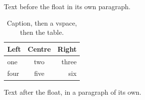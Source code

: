 \documentclass[12pt]{article}
\begin{document}
Text before the float in its own paragraph.

\begin{table}[h]
\centering
\caption{Caption, then a vspace, then the table.}
\vspace{6pt}
\begin{tabular}{lcr}\hline Left & Centre & Right\\\hline one & two & three\\ four & five & six\\\hline\end{tabular}
\end{table}

Text after the float, in a paragraph of its own.
\end{document}
